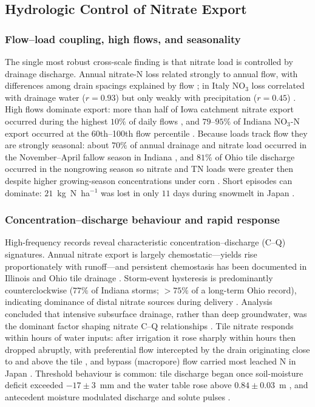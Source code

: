 \subsection{Hydrologic Control of Nitrate Export}

\subsubsection{Flow--load coupling, high flows, and seasonality}

The single most robust cross-scale finding is that nitrate load is
controlled by drainage discharge. Annual nitrate-N loss related strongly to
annual flow, with differences among drain spacings explained by flow
\parencite{Kladivko2021,Bauwe2020}; in Italy NO$_3$ loss correlated with
drainage water ($r=0.93$) but only weakly with precipitation ($r=0.45$)
\parencite{ROSSI1991}. High flows dominate export: more than half of Iowa
catchment nitrate export occurred during the highest $10\%$ of daily flows
\parencite{Ikenberry2014}, and $79$--$95\%$ of Indiana NO$_3$-N export
occurred at the 60th--100th flow percentile \parencite{Speir2021}. Because
loads track flow they are strongly seasonal: about $70\%$ of annual drainage
and nitrate load occurred in the November--April fallow season in Indiana
\parencite{Kladivko2021,Kladivko2004}, and $81\%$ of Ohio tile discharge
occurred in the nongrowing season so nitrate and TN loads were greater then
despite higher growing-season concentrations under corn
\parencite{King2016}. Short episodes can dominate: $21$~kg~N~ha$^{-1}$ was
lost in only $11$ days during snowmelt in Japan \parencite{Hayashi1999}.

\subsubsection{Concentration--discharge behaviour and rapid response}

High-frequency records reveal characteristic concentration--discharge (C--Q)
signatures. Annual nitrate export is largely chemostatic---yields rise
proportionately with runoff---and persistent chemostasis has been documented
in Illinois and Ohio tile drainage
\parencite{Speir2021,Hu2024,Williams2015}. Storm-event hysteresis is
predominantly counterclockwise ($77\%$ of Indiana storms; $>75\%$ of a
long-term Ohio record), indicating dominance of distal nitrate sources
during delivery \parencite{Speir2021,Liu2022b}. Analysis concluded that
intensive subsurface drainage, rather than deep groundwater, was the
dominant factor shaping nitrate C--Q relationships
\parencite{Liu2022b}. Tile nitrate responds within hours of water inputs:
after irrigation it rose sharply within hours then dropped abruptly, with
preferential flow intercepted by the drain originating close to and above
the tile \parencite{Mohanty1998}, and bypass (macropore) flow carried most
leached N in Japan \parencite{Hayashi1999}. Threshold behaviour is common:
tile discharge began once soil-moisture deficit exceeded $-17\pm3$~mm and
the water table rose above $0.84\pm0.03$~m \parencite{Williams2022}, and
antecedent moisture modulated discharge and solute pulses
\parencite{Trentman2020,Kennedy2012}.

